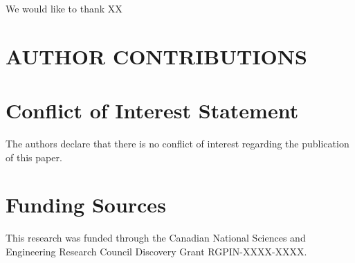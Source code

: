 \documentclass[numbered]{trbunofficial}
\begin{document}
We would like to thank XX

\section{AUTHOR CONTRIBUTIONS}


\section*{Conflict of Interest Statement}

The authors declare that there is no conflict of interest regarding the publication of this paper.

\section*{Funding Sources}

This research was funded through the Canadian National Sciences and Engineering Research Council Discovery Grant RGPIN-XXXX-XXXX.

\newpage



\end{document}
